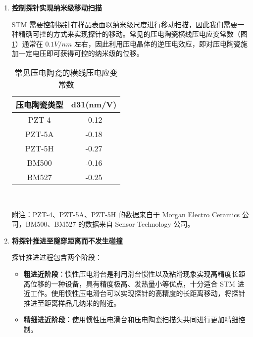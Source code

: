 \documentclass{article}
\begin{document}
\begin{spacing}{1.5}
\begin{enumerate}
		
		
		
		\item \textbf{控制探针实现纳米级移动扫描}\par
		\qquad STM 需要控制探针在样品表面以纳米级尺度进行移动扫描，因此我们需要一种精确可控的方式来实现探针的移动。常见的压电陶瓷横线压电应变常数（图 \ref{tab1}）通常在 $0.1V/nm$ 左右，因此利用压电晶体的逆压电效应，即对压电陶瓷施加一定电压即可获得可控的纳米级的位移。
		
		\begin{table}[H]
			\small
			\caption{常见压电陶瓷的横线压电应变常数}
			\centering
			\begin{tabular}{cc}
				\toprule
				\qquad\textbf{压电陶瓷类型}\qquad\qquad &\qquad \textbf{d31(nm/V)} \qquad\qquad  \\ 
				\midrule
				PZT-4	&	-0.12	\\  
				PZT-5A 	& 	-0.18	\\
				PZT-5H 	& 	-0.27	\\
				BM500 	&	-0.16	\\
				BM527	&	-0.25	\\
				\bottomrule
			\end{tabular}\\\vskip 1mm
			\begin{minipage}{0.5\linewidth}
				附注：PZT-4、PZT-5A、PZT-5H 的数据来自于 Morgan Electro Ceramics 公司，BM500、BM527 的数据来自 Sensor Technology 公司。 
			\end{minipage}
			\label{tab1}
		\end{table}
		
		
		
		
		
		\item \textbf{将探针推进至隧穿距离而不发生碰撞}\par
		探针推进过程包含两个阶段：
		\begin{itemize}
			\item \textbf{粗进近阶段}：惯性压电滑台是利用滑台惯性以及粘滑现象实现高精度长距离位移的一种设备，具有精度极高、发热量小等优点，十分适合 STM 进近工作。使用惯性压电滑台可以实现探针的高精度的长距离移动，将探针推进至距离样品几纳米的附近。
			
			\item \textbf{精细进近阶段}：使用惯性压电滑台和压电陶瓷扫描头共同进行更加精细控制。
			
		\end{itemize}
		
		
		
		
		

\end{enumerate}
\end{spacing}
\end{document}
